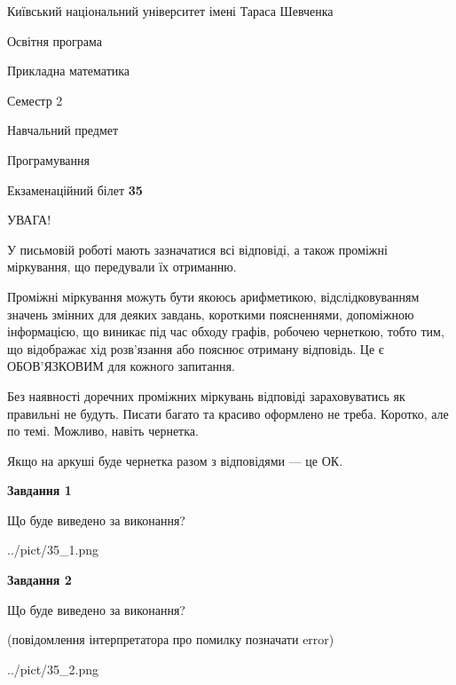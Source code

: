 \documentclass[12pt, ukrainian]{article}
\begin{document}
{{\begin {small}\par
{ \center  Київський національний університет імені Тараса Шевченка \par}
{\parbox {5 cm}{Освітня програма \hfill}{\parbox {7 cm}{Прикладна математика\hfill}}\parbox {6 cm}{\hfill Семестр 2}}\par
{\parbox {5 cm} {Навчальний предмет \hfill}\parbox {7 cm}{Програмування \hfill}\parbox {6cm}{\hfill}\par}\vspace{-7pt} \end{small}}{\center Екзаменаційний білет \No \textbf
{ 35 }\par}}
{
\begin {large}
УВАГА!

У письмовій роботі мають зазначатися всі відповіді, а також проміжні міркування, що передували їх отриманню.

Проміжні міркування можуть бути якоюсь арифметикою, відслідковуванням зна\-чень змінних для деяких завдань,
короткими поясненнями, допоміжною інформацією, що виникає під час обходу графів, робочею чернеткою,
тобто тим, що відображає хід розв’язання або пояснює отриману відповідь.
Це є ОБОВ’ЯЗКОВИМ для кожного запитання.

Без наявності доречних проміжних міркувань відповіді зараховуватись як правиль\-ні не будуть.
Писати багато та красиво оформлено не треба. Коротко, але по темі. Можли\-во, навіть чернетка.

Якщо на аркуші буде чернетка разом з відповідями --- це ОК.

\newpage

{\begin {center}\textbf{Завдання 1}\end {center}}\par
Що буде виведено за виконання?\par
\begin{center}
	{../pict/35_1.png}
\end{center}
\newpage

{\begin {center}\textbf{Завдання 2}\end {center}}\par
Що буде виведено за виконання?\par
 (повідомлення інтерпретатора про помилку позначати error)\par
\begin{center}
	{../pict/35_2.png}
\end{center}
\newpage


\end{large}}
\end{document}
